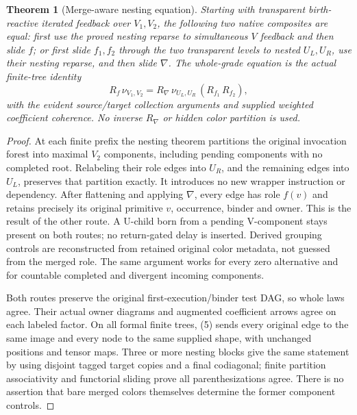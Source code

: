 \documentclass[11pt]{article}
\newtheorem{theorem}{Theorem}\newtheorem{proposition}{Proposition}
\begin{document}
\begin{theorem}[Merge-aware nesting equation]
Starting with transparent birth-reactive iterated feedback over $V_1,V_2$, the following two native composites are equal: first use the proved nesting reparse to simultaneous $V$ feedback and then slide $f$; or first slide $f_1,f_2$ through the two transparent levels to nested $U_L,U_R$, use their nesting reparse, and then slide $\nabla$. The whole-grade equation is the actual finite-tree identity
\[
 R_f\,\nu_{V_1,V_2}
 =R_{\nabla}\,\nu_{U_L,U_R}\,
       (R_{f_1}\,R_{f_2}), \tag{5}
\]
with the evident source/target collection arguments and supplied weighted coefficient coherence. No inverse $R_{\nabla}$ or hidden color partition is used.
\end{theorem}
\begin{proof}
At each finite prefix the nesting theorem partitions the original invocation forest into maximal $V_2$ components, including pending components with no completed root. Relabeling their role edges into $U_R$, and the remaining edges into $U_L$, preserves that partition exactly. It introduces no new wrapper instruction or dependency. After flattening and applying $\nabla$, every edge has role $f(v)$ and retains precisely its original primitive $v$, occurrence, binder and owner. This is the result of the other route. A U-child born from a pending V-component stays present on both routes; no return-gated delay is inserted. Derived grouping controls are reconstructed from retained original color metadata, not guessed from the merged role. The same argument works for every zero alternative and for countable completed and divergent incoming components.

Both routes preserve the original first-execution/binder test DAG, so whole laws agree. Their actual owner diagrams and augmented coefficient arrows agree on each labeled factor. On all formal finite trees, (5) sends every original edge to the same image and every node to the same supplied shape, with unchanged positions and tensor maps. Three or more nesting blocks give the same statement by using disjoint tagged target copies and a final codiagonal; finite partition associativity and functorial sliding prove all parenthesizations agree. There is no assertion that bare merged colors themselves determine the former component controls.
\end{proof}
\end{document}
